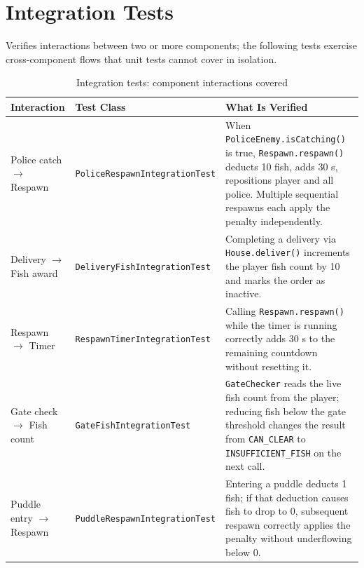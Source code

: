 \documentclass[12pt]{article}
\begin{document}
\bigskip
\bigskip
\bigskip



\section{Integration Tests}

Verifies interactions between two or more components; the following tests exercise cross-component flows that unit tests cannot cover in isolation.

\renewcommand{\arraystretch}{1.3}
\begin{table}[H]
\centering
\begin{tabular}{p{} p{} p{}}
\toprule
\textbf{Interaction} & \textbf{Test Class} & \textbf{What Is Verified} \\
\midrule
Police catch $\to$ Respawn &
  \texttt{PoliceRespawnIntegrat\-ionTest} &
  When \texttt{PoliceEnemy.isCatching()} is true, \texttt{Respawn.respawn()} deducts 10 fish, adds 30 s, repositions player and all police. Multiple sequential respawns each apply the penalty independently. \\

\addlinespace
Delivery $\to$ Fish award &
  \texttt{DeliveryFishIntegrati\-onTest} &
  Completing a delivery via \texttt{House.deliver()} increments the player fish count by 10 and marks the order as inactive. \\

\addlinespace
Respawn $\to$ Timer &
  \texttt{RespawnTimerIntegrati\-onTest} &
  Calling \texttt{Respawn.respawn()} while the timer is running correctly adds 30 s to the remaining countdown without resetting it. \\

\addlinespace
Gate check $\to$ Fish count &
  \texttt{GateFishIntegrationT\-est} &
  \texttt{GateChecker} reads the live fish count from the player; reducing fish below the gate threshold changes the result from \texttt{CAN\_CLEAR} to \texttt{INSUFFICIENT\_FISH} on the next call. \\

\addlinespace
Puddle entry $\to$ Respawn &
  \texttt{PuddleRespawnIntegrat\-ionTest} &
  Entering a puddle deducts 1 fish; if that deduction causes fish to drop to 0, subsequent respawn correctly applies the penalty without underflowing below 0. \\

\bottomrule
\end{tabular}
\caption{Integration tests: component interactions covered}
\end{table}
\end{document}
